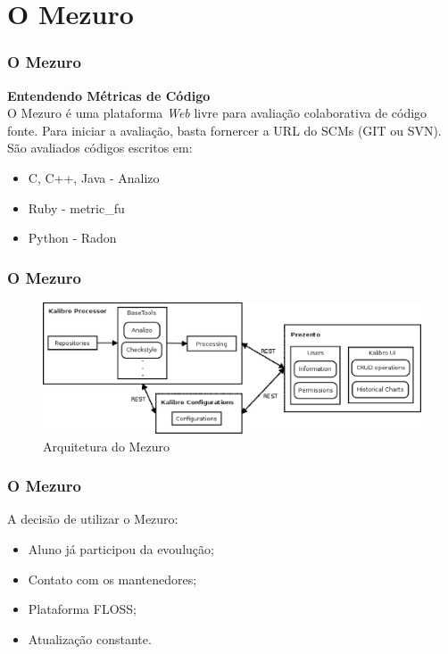 \documentclass{beamer}
\begin{document}
\section{O Mezuro} %

\begin{frame}
\frametitle{O Mezuro}

\center
\textbf{Entendendo Métricas de Código} \\
O Mezuro é uma plataforma \textit{Web} livre para avaliação colaborativa de código fonte. Para iniciar a avaliação, basta fornercer a URL do SCMs (GIT ou SVN). São avaliados códigos escritos em:
\begin{itemize}
\item C, C++, Java - Analizo
\item Ruby - metric\_fu
\item Python - Radon
\end{itemize}

\end{frame}


\begin{frame}
\frametitle{O Mezuro}

\begin{figure}[!htb]
  \centering
    \includegraphics[keepaspectratio=true,scale=0.4]
    {../figuras/mezuroCloudArch.eps}
  \caption{Arquitetura do Mezuro \cite{camarinhaOSS2015}}
  \label{fig:parallel}
\end{figure}

\end{frame}


\begin{frame}
\frametitle{O Mezuro}

A decisão de utilizar o Mezuro:
\begin{itemize}
\item Aluno já participou da evoulução;
\item Contato com os mantenedores;
\item Plataforma FLOSS;
\item Atualização constante.
\end{itemize}

\end{frame}
\end{document}

